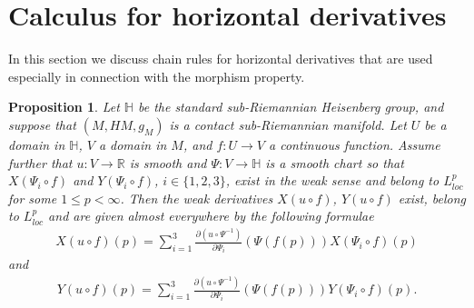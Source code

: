 \documentclass[10pt,letterpaper]{amsart}
\newtheorem{prop}[thm]{Proposition}
\theoremstyle{definition}
\numberwithin{thm}{subsection}
\numberwithin{equation}{section}
\begin{document}
\appendix

\section{Calculus for horizontal derivatives}\label{appendix}

In this section we discuss chain rules for horizontal
derivatives that are used especially in connection with the morphism property.

\begin{prop}\label{p:chain} Let ${\mathbb H}$ be the standard sub-Riemannian Heisenberg group, and suppose that $(M,HM,g_M)$ is a contact sub-Riemannian manifold.
 Let $U$ be a domain in ${\mathbb H}$, $V$ a domain in $M$, and $f:U \to V$ a continuous function. Assume further that $u: V \to \mathbb{R}$ is smooth and $\Psi: V \to {\mathbb H}$ is a smooth chart so that $X(\Psi_i \circ f)$ and $Y(\Psi_i \circ f)$, $i\in \{1,2,3\}$, exist in the weak sense and belong to $L_{loc}^p$ for some $1\leq p<\infty$. Then the weak derivatives $X(u\circ f)$, $Y(u\circ f)$ exist, belong to $L_{loc}^p$ and are given almost everywhere by the following formulae
 \begin{align*}
  X(u\circ f)(p)=\sum_{i=1}^3\frac{\partial (u\circ \Psi^{-1})}{\partial \Psi_i}(\Psi(f(p))) X(\Psi_i \circ f)(p)
 \end{align*}
and
 \begin{align*}
  Y(u\circ f)(p)=\sum_{i=1}^3\frac{\partial (u\circ \Psi^{-1})}{\partial \Psi_i}(\Psi(f(p))) Y(\Psi_i \circ
  f)(p).
 \end{align*}
\end{prop}
\end{document}
